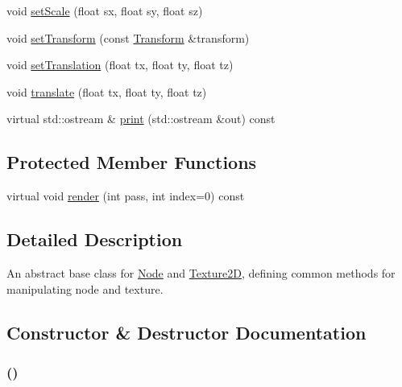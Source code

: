 \begin{CompactItemize}
void \hyperlink{classm3g_1_1Transformable_937d04042c25021532ea2532fe5e3a32}{setScale} (float sx, float sy, float sz)
\item 
void \hyperlink{classm3g_1_1Transformable_05052269aaf19775f3ff1a10d042777e}{setTransform} (const \hyperlink{classm3g_1_1Transform}{Transform} \&transform)
\item 
void \hyperlink{classm3g_1_1Transformable_afd728a7db85b8e12bdafc2b3c08a515}{setTranslation} (float tx, float ty, float tz)
\item 
void \hyperlink{classm3g_1_1Transformable_66d493b8307a85e615c4eb89116f2e09}{translate} (float tx, float ty, float tz)
\item 
virtual std::ostream \& \hyperlink{classm3g_1_1Transformable_6fea17fa1532df3794f8cb39cb4f911f}{print} (std::ostream \&out) const 
\end{CompactItemize}
\subsection*{Protected Member Functions}
\begin{CompactItemize}
\item 
virtual void \hyperlink{classm3g_1_1Transformable_1efcb1973989d9963d5bd6d03065d389}{render} (int pass, int index=0) const 
\end{CompactItemize}


\subsection{Detailed Description}
An abstract base class for \hyperlink{classm3g_1_1Node}{Node} and \hyperlink{classm3g_1_1Texture2D}{Texture2D}, defining common methods for manipulating node and texture. 

\subsection{Constructor \& Destructor Documentation}
\hypertarget{classm3g_1_1Transformable_ca6563203e3e883391c9d0927028aa04}{
\subsubsection[{Transformable}]{ ()}}
\label{classm3g_1_1Transformable_ca6563203e3e883391c9d0927028aa04}


